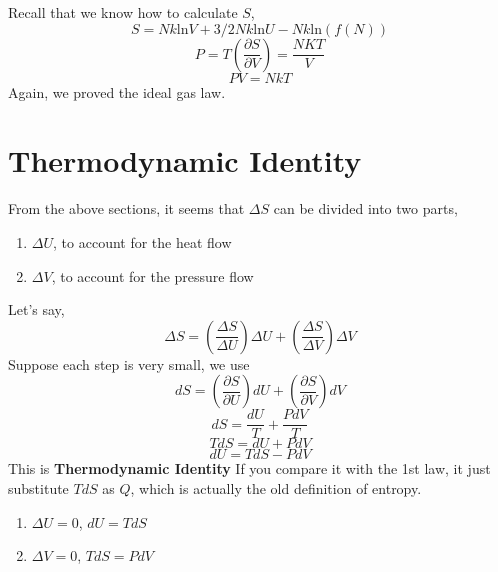 Recall that we know how to calculate $S$,
\begin{equation} S = Nk\text{ln}V + 3/2Nk\text{ln}U - Nk\text{ln}(f(N)) \end{equation}
\begin{equation} P = T(\frac {\partial{S}} {\partial{V}})  = \frac{NKT}{V}\end{equation}
\begin{equation} PV = NkT \end{equation}
Again, we proved the ideal gas law.

\section{Thermodynamic Identity}
From the above sections, it seems that $\Delta{S}$ can be divided into two parts, 
\begin{enumerate}
\item $\Delta{U}$, to account for the heat flow
\item $\Delta{V}$, to account for the pressure flow
\end{enumerate}

Let's say,
\begin{equation} \Delta{S} = (\frac {\Delta{S}}{\Delta{U}})\Delta{U} + (\frac {\Delta{S}}{\Delta{V}})\Delta{V}  \end{equation}
Suppose each step is very small, we use 
\begin{equation} dS = (\frac{\partial S}{\partial U})dU + (\frac{\partial S}{\partial V})dV  \end{equation}
\begin{equation} dS = \frac{dU}{T} + \frac{PdV}{T}  \end{equation}
\begin{equation} TdS = dU + PdV  \end{equation}
\begin{equation} dU = TdS - PdV  \end{equation}
This is {\bf Thermodynamic Identity}
If you compare it with the 1st law, it just substitute $TdS$ as $Q$, which is actually the old definition of entropy.
\begin{enumerate}
\item $\Delta{U}=0$, $dU=TdS$
\item $\Delta{V}=0$, $TdS=PdV$
\end{enumerate}


